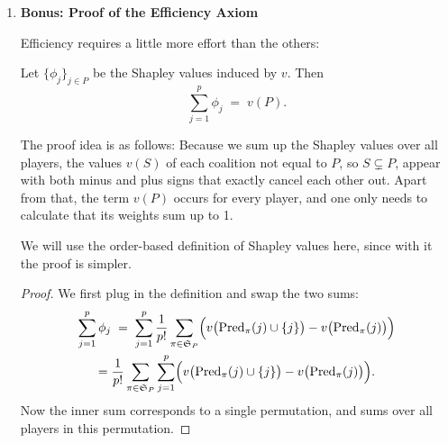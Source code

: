 {\begin{enumerate}
\begin{proof}
    \end{proof}

    
    
    \item \textbf{Bonus: Proof of the Efficiency Axiom}
    
    Efficiency requires a little more effort than the others:

    \begin{theorem}[Efficiency]
    Let $\{\phi_j\}_{j \in P}$ be the Shapley values induced by $v$.
    Then
    $$
    \sum_{j=1}^p \phi_j \;=\; v(P).
    $$
    \end{theorem}

    The proof idea is as follows: Because we sum up the Shapley values over all players, the values $v(S)$ of each coalition not equal to $P$, so $S \subsetneq P$, appear with both minus and plus signs that exactly cancel each other out.
    Apart from that, the term $v(P)$ occurs for every player, and one only needs to calculate that its weights sum up to 1.
    
    We will use the order-based definition of Shapley values here, since with it the proof is simpler.

    \begin{proof}
        
        We first plug in the definition and swap the two sums:
        \begin{gather*}
            \sum_{j=1}^p \phi_j 
            \;=\;
            \sum_{j=1}^p \frac{1}{p!} \sum_{\pi \in \mathfrak{S}_P} \Bigl(
                v\bigl( \mathrm{Pred}_\pi(j) \cup \{j\} \bigr)
                - v\bigl( \mathrm{Pred}_\pi(j) \bigr)
            \Bigr) \\
            = \frac{1}{p!} \sum_{\pi \in \mathfrak{S}_P} \sum_{j=1}^p \Bigl(
                v\bigl( \mathrm{Pred}_\pi(j) \cup \{j\} \bigr)
                - v\bigl( \mathrm{Pred}_\pi(j) \bigr)
            \Bigr).
        \end{gather*}
        Now the inner sum corresponds to a single permutation, and sums over all players in this permutation.
        

\end{proof}
\end{enumerate}}

